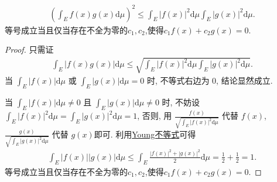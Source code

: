 \documentclass[../../main.tex]{subfiles}%
\begin{document}
\begin{theorem}[Cauchy积分不等式]\label{theorem:Cauchy积分不等式}
\begin{align*}
\left(\int_E f(x)g(x) \mathrm{d}\mu\right)^2 \leqslant \int_E |f(x)|^2 \mathrm{d}\mu \int_E |g(x)|^2 \mathrm{d}\mu.
\end{align*} 
等号成立当且仅当存在不全为零的$c_1,c_2$,使得$c_1f(x)+c_2g(x)=0.$
\end{theorem}
\begin{proof}
只需证
\begin{align*}
\int_E |f(x)g(x)| \mathrm{d}\mu \leqslant \sqrt{\int_E |f(x)|^2 \mathrm{d}\mu \int_E |g(x)|^2 \mathrm{d}\mu}.
\end{align*}
当 $\int_E |f(x)| \mathrm{d}\mu$ 或 $\int_E |g(x)| \mathrm{d}\mu = 0$ 时, 不等式右边为 $0$, 结论显然成立.

当 $\int_E |f(x)| \mathrm{d}\mu \ne 0$ 且 $\int_E |g(x)| \mathrm{d}\mu \ne 0$ 时, 不妨设 $\int_E |f(x)|^2 \mathrm{d}\mu = \int_E |g(x)|^2 \mathrm{d}\mu = 1$, 否则, 用 $\frac{f(x)}{\sqrt{\int_E |f(x)|^2 \mathrm{d}\mu}}$ 代替 $f(x)$, $\frac{g(x)}{\sqrt{\int_E |g(x)|^2 \mathrm{d}\mu}}$ 代替 $g(x)$即可.
利用\hyperref[theorem:Young不等式初等形式]{Young不等式}可得
\begin{align*}
\int_E |f(x)||g(x)| \mathrm{d}\mu \leqslant \int_E \frac{|f(x)|^2 + |g(x)|^2}{2} \mathrm{d}\mu = \frac{1}{2} + \frac{1}{2} = 1.
\end{align*}
等号成立当且仅当存在不全为零的$c_1,c_2$,使得$c_1f(x)+c_2g(x)=0.$
\end{proof}
\end{document}
